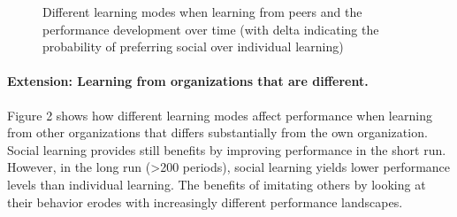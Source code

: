 \begin{figure}[htb]
	\centering
	\quad
	\label{fig:f1}
	\caption{Different learning modes when learning from peers and the performance development over time (with delta indicating the probability of preferring social over individual learning)}
\end{figure}




\paragraph*{Extension: Learning from organizations that are different. } Figure 2 shows how different learning modes affect performance when learning from other organizations that differs substantially from the own organization. Social learning provides still benefits by improving performance in the short run. However, in the long run (>200 periods), social learning yields lower performance levels than individual learning. The benefits of imitating others by looking at their behavior erodes with increasingly different performance landscapes.


